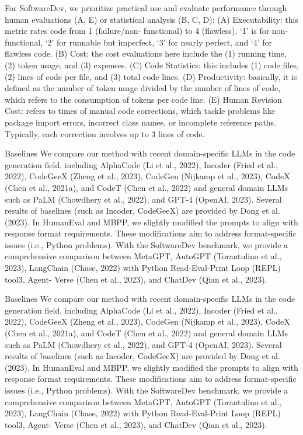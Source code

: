 \documentclass[12pt]{article}
\begin{document}
For SoftwareDev, we prioritize practical use and evaluate performance through human evaluations
(A, E) or statistical analysis (B, C, D): (A) Executability: this metric rates code from 1 (failure/non-
functional) to 4 (flawless). ‘1’ is for non-functional, ‘2’ for runnable but imperfect, ‘3’ for nearly
perfect, and ‘4’ for flawless code. (B) Cost: the cost evaluations here include the (1) running time,
(2) token usage, and (3) expenses. (C) Code Statistics: this includes (1) code files, (2) lines of code
per file, and (3) total code lines. (D) Productivity: basically, it is defined as the number of token
usage divided by the number of lines of code, which refers to the consumption of tokens per code
line. (E) Human Revision Cost: refers to times of manual code corrections, which tackle problems
like package import errors, incorrect class names, or incomplete reference paths. Typically, each
correction involves up to 3 lines of code.


Baselines We compare our method with recent domain-specific LLMs in the code generation field,
including AlphaCode (Li et al., 2022), Incoder (Fried et al., 2022), CodeGeeX (Zheng et al., 2023),
CodeGen (Nijkamp et al., 2023), CodeX (Chen et al., 2021a), and CodeT (Chen et al., 2022) and
general domain LLMs such as PaLM (Chowdhery et al., 2022), and GPT-4 (OpenAI, 2023). Several
results of baselines (such as Incoder, CodeGeeX) are provided by Dong et al. (2023). In HumanEval
and MBPP, we slightly modified the prompts to align with response format requirements. These
modifications aim to address format-specific issues (i.e., Python problems). With the SoftwareDev
benchmark, we provide a comprehensive comparison between MetaGPT, AutoGPT (Torantulino
et al., 2023), LangChain (Chase, 2022) with Python Read-Eval-Print Loop (REPL) tool3, Agent-
Verse (Chen et al., 2023), and ChatDev (Qian et al., 2023).


Baselines We compare our method with recent domain-specific LLMs in the code generation field,
including AlphaCode (Li et al., 2022), Incoder (Fried et al., 2022), CodeGeeX (Zheng et al., 2023),
CodeGen (Nijkamp et al., 2023), CodeX (Chen et al., 2021a), and CodeT (Chen et al., 2022) and
general domain LLMs such as PaLM (Chowdhery et al., 2022), and GPT-4 (OpenAI, 2023). Several
results of baselines (such as Incoder, CodeGeeX) are provided by Dong et al. (2023). In HumanEval
and MBPP, we slightly modified the prompts to align with response format requirements. These
modifications aim to address format-specific issues (i.e., Python problems). With the SoftwareDev
benchmark, we provide a comprehensive comparison between MetaGPT, AutoGPT (Torantulino
et al., 2023), LangChain (Chase, 2022) with Python Read-Eval-Print Loop (REPL) tool3, Agent-
Verse (Chen et al., 2023), and ChatDev (Qian et al., 2023).
\end{document}
